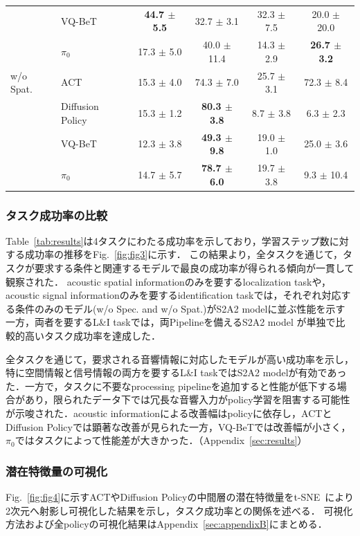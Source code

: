 \documentclass{article}
\begin{document}
\begin{table}[t]
\begin{tabular}{llcccc}
			 & VQ-BeT & \textbf{44.7 $\pm$ 5.5} & 32.7 $\pm$ 3.1 & 32.3 $\pm$ 7.5 & 20.0 $\pm$ 20.0 \\
			 & $\pi_0$ & 17.3 $\pm$ 5.0 & 40.0 $\pm$ 11.4 & 14.3 $\pm$ 2.9 & \textbf{26.7 $\pm$ 3.2} \\
			\hline
			w/o Spat. & ACT & 15.3 $\pm$ 4.0 & 74.3 $\pm$ 7.0 & 25.7 $\pm$ 3.1 & 72.3 $\pm$ 8.4 \\
			 & Diffusion Policy & 15.3 $\pm$ 1.2 & \textbf{80.3 $\pm$ 3.8} & 8.7 $\pm$ 3.8 & 6.3 $\pm$ 2.3 \\
			 & VQ-BeT & 12.3 $\pm$ 3.8 & \textbf{49.3 $\pm$ 9.8} & 19.0 $\pm$ 1.0 & 25.0 $\pm$ 3.6 \\
			 & $\pi_0$ & 14.7 $\pm$ 5.7 & \textbf{78.7 $\pm$ 6.0} & 19.7 $\pm$ 3.8 & 9.3 $\pm$ 10.4 \\
			\hline
		\end{tabular}
	\end{table}

\subsubsection{タスク成功率の比較}
	Table~\ref{tab:results}は4タスクにわたる成功率を示しており，学習ステップ数に対する成功率の推移をFig.~\ref{fig:fig3}に示す．
	この結果より，全タスクを通じて，タスクが要求する条件と関連するモデルで最良の成功率が得られる傾向が一貫して観察された．
	acoustic spatial informationのみを要するlocalization taskや，acoustic signal informationのみを要するidentification taskでは，それぞれ対応する条件のみのモデル(w/o Spec. and w/o Spat.)がS2A2 modelに並ぶ性能を示す一方，両者を要するL\&I taskでは，両Pipelineを備えるS2A2 model が単独で比較的高いタスク成功率を達成した．
	
	全タスクを通じて，要求される音響情報に対応したモデルが高い成功率を示し，特に空間情報と信号情報の両方を要するL\&I taskではS2A2 modelが有効であった．一方で，タスクに不要なprocessing pipelineを追加すると性能が低下する場合があり，限られたデータ下では冗長な音響入力がpolicy学習を阻害する可能性が示唆された．acoustic informationによる改善幅はpolicyに依存し，ACTとDiffusion Policyでは顕著な改善が見られた一方，VQ-BeTでは改善幅が小さく，$\pi_0$ではタスクによって性能差が大きかった．（Appendix~\ref{sec:results}）

\subsubsection{潜在特徴量の可視化}
\label{sec:visualization}
	Fig.~\ref{fig:fig4}に示すACTやDiffusion Policyの中間層の潜在特徴量をt-SNE~\citep{vandermaaten2008tsne}により2次元へ射影し可視化した結果を示し，タスク成功率との関係を述べる．
	可視化方法および全policyの可視化結果はAppendix~\ref{sec:appendixB}にまとめる．
\end{document}
